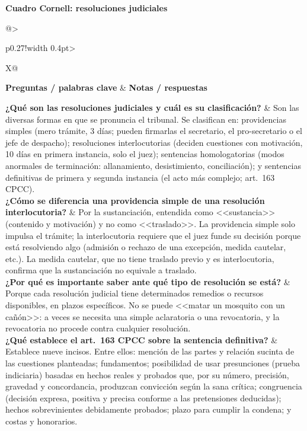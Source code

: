 \documentclass[12pt,oneside]{book}
\makeatletter
\newcommand{\cornelltitle}[1]{\par\bigskip\noindent\textbf{\sffamily Cuadro Cornell: #1}\par\nopagebreak\smallskip}
\newcommand{\cqrow}[2]{\textbf{#1} & #2 \\[0.5em]}
\newcommand{\cornellblock}[1]{%
  \noindent\begin{tabularx}{\textwidth}{@{}>{\raggedright\arraybackslash}p{0.27\textwidth}!{\vrule width 0.4pt}>{\raggedright\arraybackslash}X@{}}
  \toprule
  \textbf{Preguntas / palabras clave} & \textbf{Notas / respuestas} \\
  \midrule
  #1
  \bottomrule
  \end{tabularx}\par}
\makeatother
\begin{document}
\cornelltitle{resoluciones judiciales}
\cornellblock{
\cqrow{¿Qué son las resoluciones judiciales y cuál es su clasificación?}{Son las diversas formas en que se pronuncia el tribunal. Se clasifican en: providencias simples (mero trámite, 3 días; pueden firmarlas el secretario, el pro-secretario o el jefe de despacho); resoluciones interlocutorias (deciden cuestiones con motivación, 10 días en primera instancia, solo el juez); sentencias homologatorias (modos anormales de terminación: allanamiento, desistimiento, conciliación); y sentencias definitivas de primera y segunda instancia (el acto más complejo; art.~163 CPCC).
}
\cqrow{¿Cómo se diferencia una providencia simple de una resolución interlocutoria?}{Por la sustanciación, entendida como <<sustancia>> (contenido y motivación) y no como <<traslado>>. La providencia simple solo impulsa el trámite; la interlocutoria requiere que el juez funde su decisión porque está resolviendo algo (admisión o rechazo de una excepción, medida cautelar, etc.). La medida cautelar, que no tiene traslado previo y es interlocutoria, confirma que la sustanciación no equivale a traslado.
}
\cqrow{¿Por qué es importante saber ante qué tipo de resolución se está?}{Porque cada resolución judicial tiene determinados remedios o recursos disponibles, en plazos específicos. No se puede <<matar un mosquito con un cañón>>: a veces se necesita una simple aclaratoria o una revocatoria, y la revocatoria no procede contra cualquier resolución.
}
\cqrow{¿Qué establece el art.~163 CPCC sobre la sentencia definitiva?}{Establece nueve incisos. Entre ellos: mención de las partes y relación sucinta de las cuestiones planteadas; fundamentos; posibilidad de usar presunciones (prueba indiciaria) basadas en hechos reales y probados que, por su número, precisión, gravedad y concordancia, produzcan convicción según la sana crítica; congruencia (decisión expresa, positiva y precisa conforme a las pretensiones deducidas); hechos sobrevinientes debidamente probados; plazo para cumplir la condena; y costas y honorarios.
}
}
\medskip
\end{document}

